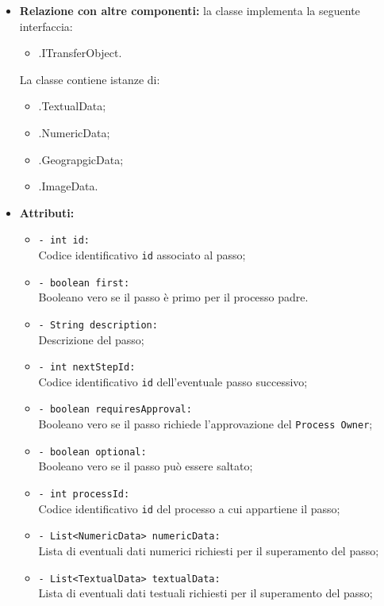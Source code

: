 \begin{flushleft}
\begin{itemize}
\item \textbf{Relazione con altre componenti:} la classe implementa la seguente interfaccia:
		\begin{itemize}
			\item \smodel{}.ITransferObject.
		\end{itemize}
		La classe contiene istanze di:
		\begin{itemize}
			\item \smodel{}.TextualData;
			\item \smodel{}.NumericData;
			\item \smodel{}.GeograpgicData;
			\item \smodel{}.ImageData.
		\end{itemize}
\item \textbf{Attributi:}
\begin{sloppypar}
\begin{itemize}
\item \texttt{- int id:}\\ Codice identificativo \texttt{id} associato al passo;
\item \texttt{- boolean first:}\\ Booleano vero se il passo è primo per il processo padre.
\item \texttt{- String description:}\\ Descrizione del passo;
\item \texttt{- int nextStepId:}\\ Codice identificativo \texttt{id} dell'eventuale passo successivo;
\item \texttt{- boolean requiresApproval:}\\ Booleano vero se il passo richiede l'approvazione del \texttt{Process Owner};
\item \texttt{- boolean optional:}\\ Booleano vero se il passo può essere saltato;
\item \texttt{- int processId:}\\ Codice identificativo \texttt{id} del processo a cui appartiene il passo;
\item \texttt{- List<NumericData> numericData:}\\ Lista di eventuali dati numerici richiesti per il superamento del passo;
\item \texttt{- List<TextualData> textualData:}\\ Lista di eventuali dati testuali richiesti per il superamento del passo;

\end{itemize}
\end{sloppypar}
\end{itemize}
\end{flushleft}

